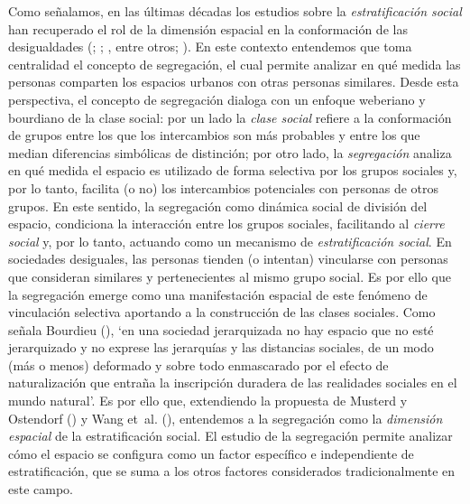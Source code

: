 \documentclass[
  spanish,
  a4paper,%
  chapterprefix=true,%
  DIV=calc,%
  twoside]{scrbook}%
\begin{document}
Como señalamos, en las últimas décadas los estudios sobre la
\emph{estratificación social} han recuperado el rol de la dimensión espacial
en la conformación de las desigualdades (; ; , entre otros; ). En este contexto entendemos
que toma centralidad el concepto de segregación, el cual permite
analizar en qué medida las personas comparten los espacios urbanos con
otras personas similares. Desde esta perspectiva, el concepto de
segregación dialoga con un enfoque weberiano y bourdiano de la clase
social: por un lado la \emph{clase social} refiere a la conformación de
grupos entre los que los intercambios son más probables y entre los que
median diferencias simbólicas de distinción; por otro lado, la
\emph{segregación} analiza en qué medida el espacio es utilizado de forma
selectiva por los grupos sociales y, por lo tanto, facilita (o no) los
intercambios potenciales con personas de otros grupos. En este sentido,
la segregación como dinámica social de división del espacio, condiciona
la interacción entre los grupos sociales, facilitando al \emph{cierre social}
y, por lo tanto, actuando como un mecanismo de \emph{estratificación social}.
En sociedades desiguales, las personas tienden (o intentan) vincularse
con personas que consideran similares y pertenecientes al mismo grupo
social. Es por ello que la segregación emerge como una manifestación
espacial de este fenómeno de vinculación selectiva aportando a la
construcción de las clases sociales. Como señala Bourdieu (),
`en una sociedad jerarquizada no hay espacio que no esté jerarquizado y
no exprese las jerarquías y las distancias sociales, de un modo (más o
menos) deformado y sobre todo enmascarado por el efecto de
naturalización que entraña la inscripción duradera de las realidades
sociales en el mundo natural'. Es por ello que, extendiendo la propuesta
de Musterd y Ostendorf () y Wang et~al. (), entendemos a la segregación como la
\emph{dimensión espacial} de la
estratificación
social. El estudio de la segregación permite analizar cómo el espacio se
configura como un factor específico e independiente de estratificación,
que se suma a los otros factores considerados tradicionalmente en este
campo.
\end{document}
